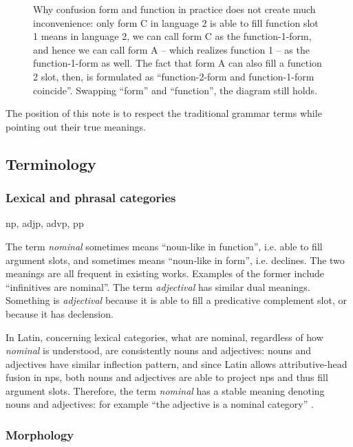 \documentclass{article}
\newcommand*{\term}[1]{\emph{#1}}
\begin{document}
\begin{figure}
    \centering
    
    \caption{Why confusion form and function in practice does not create much inconvenience:
    only form C in language 2 is able to fill function slot 1 means in language 2,
    we can call form C as the function-1-form,
    and hence we can call form A -- which realizes function 1 -- as the function-1-form as well.
    The fact that form A can also fill a function 2 slot, then,
    is formulated as ``function-2-form and function-1-form coincide''.
    Swapping ``form'' and ``function'', the diagram still holds.}
    \label{fig:form-function}
\end{figure}

The position of this note is to respect the traditional grammar terms
while pointing out their true meanings.

\subsection{Terminology}

\subsubsection{Lexical and phrasal categories}

\acl{np}, \ac{adjp}, \ac{advp}, \ac{pp}

The term \term{nominal} sometimes means ``noun-like in function'',
i.e. able to fill argument slots,
and sometimes means ``noun-like in form'',
i.e. declines.
The two meanings are all frequent in existing works.
Examples of the former include ``infinitives are nominal''.
The term \term{adjectival} has similar dual meanings.
Something is \term{adjectival} because it is able to fill a predicative complement slot,
or because it has declension.

In Latin, concerning lexical categories, 
what are nominal, regardless of how \term{nominal} is understood,
are consistently nouns and adjectives:
nouns and adjectives have similar inflection pattern,
and since Latin allows attributive-head fusion in \ac{np}s, %
both nouns and adjectives are able to project \ac{np}s and thus fill argument slots.
Therefore, the term \term{nominal} has a stable meaning denoting nouns and adjectives: 
for example ``the adjective is a nominal category'' \citep{de1991gerund}.

\subsubsection{Morphology}
\end{document}
